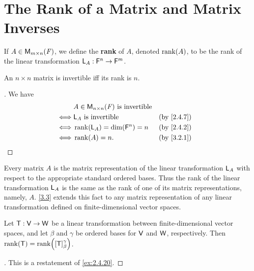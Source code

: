 \section{The Rank of a Matrix and Matrix Inverses}\label{sec:3.2}

\begin{defn}\label{3.2.1}
  If \(A \in \ms\), we define the \textbf{rank} of \(A\), denoted \(\rk{A}\), to be the rank of the linear transformation \(\mathsf{L}_A : \mathsf{F}^n \to \mathsf{F}^m\).
\end{defn}

\begin{cor}\label{3.2.2}
  An \(n \times n\) matrix is invertible iff its rank is \(n\).
\end{cor}

\begin{proof}[]
  We have
  \begin{align*}
         & A \in \ms[n][n][\F] \text{ is invertible}                 \\
    \iff & \L_A \text{ is invertible}                &  & \by{2.4.7} \\
    \iff & \rk{\L_A} = \dim(\vs{F}^n) = n            &  & \by{2.4.2} \\
    \iff & \rk{A} = n.                               &  & \by{3.2.1}
  \end{align*}
\end{proof}

\begin{note}
  Every matrix \(A\) is the matrix representation of the linear transformation \(\mathsf{L}_A\) with respect to the appropriate standard ordered bases.
  Thus the rank of the linear transformation \(\mathsf{L}_A\) is the same as the rank of one of its matrix representations, namely, \(A\).
  \cref{3.3} extends this fact to any matrix representation of any linear transformation defined on finite-dimensional vector spaces.
\end{note}

\begin{thm}\label{3.3}
  Let \(\mathsf{T} : \mathsf{V} \to \mathsf{W}\) be a linear transformation between finite-dimensional vector spaces, and let \(\beta\) and \(\gamma\) be ordered bases for \(\mathsf{V}\) and \(\mathsf{W}\), respectively.
  Then \(\rk{\T} = \rk{[\T]_{\beta}^{\gamma}}\).
\end{thm}

\begin{proof}[]
  This is a restatement of \cref{ex:2.4.20}.
\end{proof}

